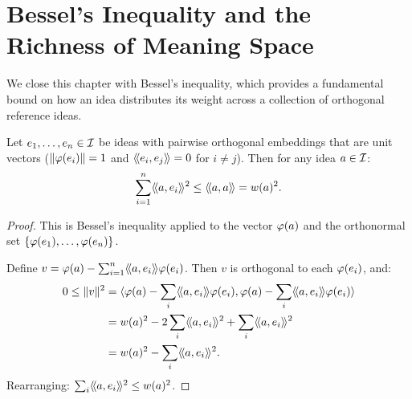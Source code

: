 \section{Bessel's Inequality and the Richness of Meaning Space}

We close this chapter with Bessel's inequality, which provides a fundamental
bound on how an idea distributes its weight across a collection of orthogonal
reference ideas.

\begin{theorem}
\label{thm:bessel}
Let $e_1, \ldots, e_n \in \mathcal{I}$ be ideas with pairwise orthogonal embeddings
that are unit vectors ($\lVert \varphi(e_i) \rVert = 1$ and $\langle\!\langle e_i, e_j \rangle\!\rangle = 0$ for
$i \neq j$). Then for any idea $a \in \mathcal{I}$:
\[
  \sum_{i=1}^n \langle\!\langle a, e_i \rangle\!\rangle^2 \leq \langle\!\langle a, a \rangle\!\rangle = w(a)^2.
\]
\end{theorem}

\begin{proof}
This is Bessel's inequality applied to the vector $\varphi(a)$ and the
orthonormal set $\{\varphi(e_1), \ldots, \varphi(e_n)\}$.

Define $v = \varphi(a) - \sum_{i=1}^n \langle\!\langle a, e_i \rangle\!\rangle \varphi(e_i)$. Then $v$ is
orthogonal to each $\varphi(e_i)$, and:
\begin{align*}
  0 \leq \nrm{v}^2
  &= \ip{\embed{a} - \sum_i \rs{a}{e_i}\embed{e_i}}
        {\embed{a} - \sum_i \rs{a}{e_i}\embed{e_i}} \\
  &= w(a)^2 - 2\sum_i \rs{a}{e_i}^2 + \sum_i \rs{a}{e_i}^2 \\
  &= w(a)^2 - \sum_i \rs{a}{e_i}^2.
\end{align*}
Rearranging: $\sum_i \langle\!\langle a, e_i \rangle\!\rangle^2 \leq w(a)^2$.
\end{proof}

